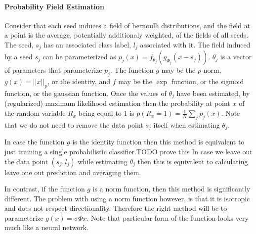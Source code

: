 \documentclass[14pt]{article}
\newcommand{\tudu}[1][]{{\color{red}TODO #1}}
\begin{document}
\paragraph{Probability Field Estimation}
Consider that each seed induces a field of bernoulli distributions, and the
field at a point is the average, potentially additionaly weighted,
of the fields of all seeds. The seed, $s_j$ has an associated class label, $l_j$ associated
with it. The field induced by a seed $s_j$ can be
parameterized as $p_j(x) = f_{\theta_j}(g_{\Phi_j}(x - s_j))$. $\theta_j$ is a vector of
parameters that parameterize $p_j$. The function $g$ may be the
$p$-norm, $g(x) = ||x||_p$, or the identity, and $f$ may be the $\exp$
function, or the sigmoid function, or the gaussian function. Once the values
of $\theta_j$ have been estimated, by (regularized) maximum likelihood estimation
then the probability at point $x$ of the random variable $R_x$ being equal to $1$ is
$p(R_x = 1) = \frac{1}{N} \sum_{j} p_j(x)$. Note that we do not need to remove the data
point $s_j$ itself when estimating $\theta_j$.

In case the function $g$ is the identity function then this method is equivalent
to just training a single probabilistic classifier.\tudu[prove this] In case we leave out the
data point $(s_j, l_j)$ while estimating $\theta_j$ then this is equivalent
to calculating leave one out prediction and averaging them.

In contrast, if the function $g$ is a norm function, then this method is
significantly different. The problem with using a norm function however,
is that it is isotropic and does not respect directionality. Therefore the
right method will be to parameterize $g(x)=\sigma{\Phi{x}}$. Note that
particular form of the function looks very much like a neural network.
% 
% 
\end{document}
